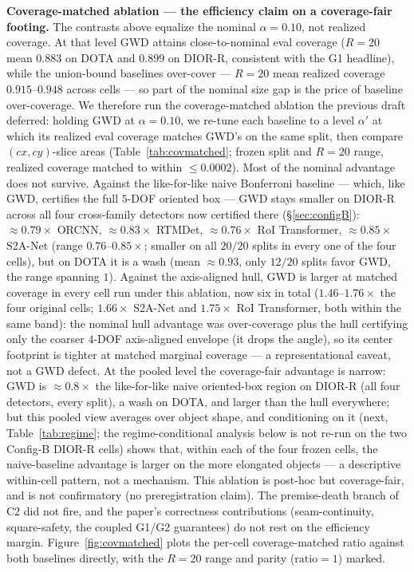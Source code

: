 \documentclass[journal]{IEEEtran}
\begin{document}
\textbf{Coverage-matched ablation --- the efficiency claim on a coverage-fair footing.} The contrasts
above equalize the nominal $\alpha=0.10$, not realized coverage. At that level GWD attains
close-to-nominal eval coverage ($R{=}20$ mean $0.883$ on DOTA and $0.899$ on DIOR-R, consistent with the
G1 headline), while the union-bound baselines over-cover --- $R{=}20$ mean realized coverage
$0.915$--$0.948$ across cells --- so part of the nominal size gap is the price of baseline over-coverage.
We therefore run the coverage-matched ablation the previous draft deferred: holding GWD at $\alpha=0.10$,
we re-tune each baseline to a level $\alpha'$ at which its realized eval coverage matches GWD's on
the same split, then compare $(cx,cy)$-slice areas (Table~\ref{tab:covmatched}; frozen split and $R{=}20$
range, realized coverage matched to within $\le 0.0002$).
Most of the nominal advantage does not survive. Against the like-for-like naive Bonferroni
baseline --- which, like GWD, certifies the full $5$-DOF oriented box --- GWD stays smaller on DIOR-R across
all four cross-family detectors now certified there (\S\ref{sec:configB}): $\approx0.79\times$ ORCNN,
$\approx0.83\times$ RTMDet, $\approx0.76\times$ RoI Transformer, $\approx0.85\times$ S2A-Net (range
$0.76$--$0.85\times$; smaller on all $20/20$ splits in every one of the four cells),
but on DOTA it is a wash (mean $\approx0.93$, only $12/20$ splits favor GWD, the range spanning
$1$). Against the axis-aligned hull, GWD is larger at matched coverage in every cell run under this
ablation, now six in total ($1.46$--$1.76\times$ the four original cells; $1.66\times$ S2A-Net and
$1.75\times$ RoI Transformer, both within the same band): the nominal hull advantage was over-coverage
plus the hull certifying only
the coarser $4$-DOF axis-aligned envelope (it drops the angle), so its center footprint is tighter at
matched marginal coverage --- a representational caveat, not a GWD defect. At the pooled level the
coverage-fair advantage is narrow: GWD is $\approx0.8\times$ the like-for-like naive oriented-box region
on DIOR-R (all four detectors, every split), a wash on DOTA, and larger than the hull everywhere; but this
pooled view averages over object shape, and conditioning on it (next, Table~\ref{tab:regime}; the
regime-conditional analysis below is not re-run on the two Config-B DIOR-R cells) shows that,
within each of the four frozen cells, the naive-baseline advantage is larger on the more elongated
objects --- a descriptive within-cell pattern, not a mechanism. This ablation is post-hoc but coverage-fair, and is
not confirmatory (no preregistration claim). The premise-death branch of C2 did not fire, and the
paper's correctness contributions (seam-continuity, square-safety, the coupled G1/G2 guarantees) do not
rest on the efficiency margin. Figure~\ref{fig:covmatched} plots the per-cell coverage-matched ratio
against both baselines directly, with the $R{=}20$ range and parity ($\mathrm{ratio}=1$) marked.
\end{document}
